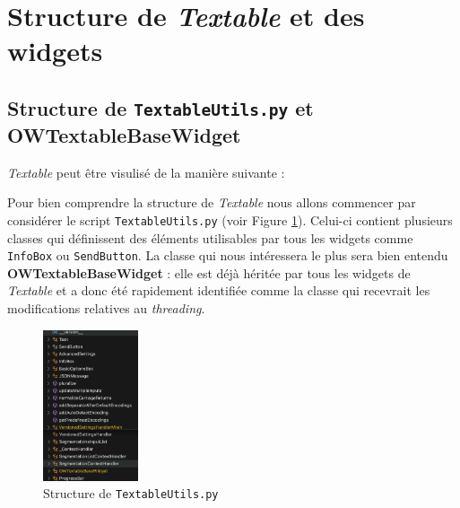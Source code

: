 \documentclass{article}
\begin{document}
\section{Structure de \textit{Textable} et des widgets}

\subsection{Structure de \texttt{TextableUtils.py} et \textbf{OWTextableBaseWidget}}

\textit{Textable} peut être visulisé de la manière suivante :
\vspace{5mm}

\vspace{5mm}

Pour bien comprendre la structure de \textit{Textable} nous allons commencer par considérer le script \texttt{TextableUtils.py} (voir Figure \ref{fig:textable_utils}). Celui-ci contient plusieurs classes qui définissent des éléments utilisables par tous les widgets comme \texttt{InfoBox} ou \texttt{SendButton}. La classe qui nous intéressera le plus sera bien entendu \textbf{OWTextableBaseWidget} : elle est déjà héritée par tous les widgets de \textit{Textable} et a donc été rapidement identifiée comme la classe qui recevrait les modifications relatives au \textit{threading}.

\vspace{5mm}

\begin{figure}[htbp]
    \centering
    \includegraphics[width=0.25\textwidth]{structure_utils.png}
    \caption{Structure de \texttt{TextableUtils.py}}
    \label{fig:textable_utils}
\end{figure}
\end{document}
